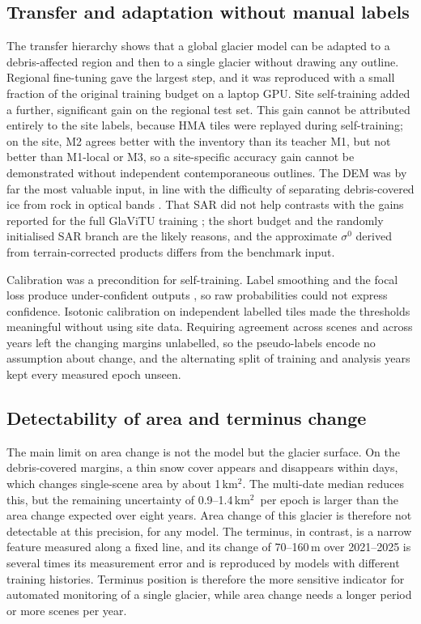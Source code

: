 \documentclass[pdflatex,sn-mathphys-num]{sn-jnl}%
\theoremstyle{thmstyleone}%
\theoremstyle{thmstyletwo}%
\theoremstyle{thmstylethree}%
\newcommand{\kmsq}{km$^2$}
\begin{document}
\subsection{Transfer and adaptation without manual labels}\label{subsec5.1}

The transfer hierarchy shows that a global glacier model can be adapted to a debris-affected region and then to a single glacier without drawing any outline. Regional fine-tuning gave the largest step, and it was reproduced with a small fraction of the original training budget on a laptop GPU. Site self-training added a further, significant gain on the regional test set. This gain cannot be attributed entirely to the site labels, because HMA tiles were replayed during self-training; on the site, M2 agrees better with the inventory than its teacher M1, but not better than M1-local or M3, so a site-specific accuracy gain cannot be demonstrated without independent contemporaneous outlines. The DEM was by far the most valuable input, in line with the difficulty of separating debris-covered ice from rock in optical bands \cite{scherler2011,xie2020}. That SAR did not help contrasts with the gains reported for the full GlaViTU training \cite{maslov2025}; the short budget and the randomly initialised SAR branch are the likely reasons, and the approximate $\sigma^0$ derived from terrain-corrected products differs from the benchmark input.

Calibration was a precondition for self-training. Label smoothing and the focal loss produce under-confident outputs \cite{guo2017}, so raw probabilities could not express confidence. Isotonic calibration on independent labelled tiles made the thresholds meaningful without using site data. Requiring agreement across scenes and across years left the changing margins unlabelled, so the pseudo-labels encode no assumption about change, and the alternating split of training and analysis years kept every measured epoch unseen.

\subsection{Detectability of area and terminus change}\label{subsec5.2}

The main limit on area change is not the model but the glacier surface. On the debris-covered margins, a thin snow cover appears and disappears within days, which changes single-scene area by about 1\,\kmsq. The multi-date median reduces this, but the remaining uncertainty of 0.9--1.4\,\kmsq\ per epoch is larger than the area change expected over eight years. Area change of this glacier is therefore not detectable at this precision, for any model. The terminus, in contrast, is a narrow feature measured along a fixed line, and its change of 70--160\,m over 2021--2025 is several times its measurement error and is reproduced by models with different training histories. Terminus position is therefore the more sensitive indicator for automated monitoring of a single glacier, while area change needs a longer period or more scenes per year.
\end{document}
